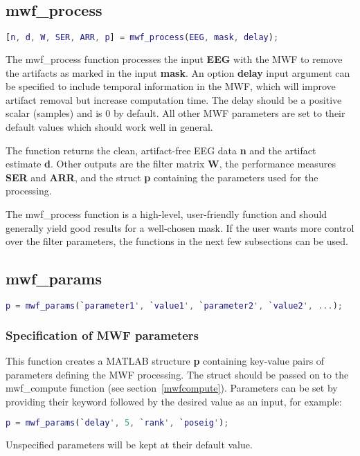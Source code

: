 \documentclass[11pt]{article}
\begin{document}
\subsection{mwf\_process}

\begin{lstlisting}[frame=single, language=matlab]
[n, d, W, SER, ARR, p] = mwf_process(EEG, mask, delay);
\end{lstlisting}

The mwf\_process function processes the input \textbf{EEG} with the MWF to remove the artifacts as marked in the input \textbf{mask}. An option \textbf{delay} input argument can be specified to include temporal information in the MWF, which will improve artifact removal but increase computation time. The delay should be a positive scalar (samples) and is 0 by default. All other MWF parameters are set to their default values which should work well in general.

The function returns the clean, artifact-free EEG data \textbf{n} and the artifact estimate \textbf{d}. Other outputs are the filter matrix \textbf{W}, the performance measures \textbf{SER} and \textbf{ARR}, and the struct \textbf{p} containing the parameters used for the processing.

The mwf\_process function is a high-level, user-friendly function and should generally yield good results for a well-chosen mask. If the user wants more control over the filter parameters, the functions in the next few subsections can be used.

\newpage
\subsection{mwf\_params}
\label{mwfparams}

\begin{lstlisting}[frame=single, language=matlab]
p = mwf_params(`parameter1', `value1', `parameter2', `value2', ...);
\end{lstlisting}

\subsubsection{Specification of MWF parameters}

This function creates a MATLAB structure \textbf{p} containing key-value pairs of parameters defining the MWF processing. The struct should be passed on to the mwf\_compute function (see section~\ref{mwfcompute}). Parameters can be set by providing their keyword followed by the desired value as an input, for example:
%
\begin{lstlisting}[frame=single, language=matlab]
p = mwf_params(`delay', 5, `rank', `poseig');
\end{lstlisting}
%
Unspecified parameters will be kept at their default value.
\end{document}
